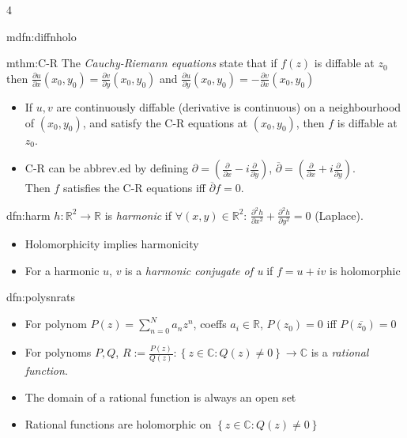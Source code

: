 \documentclass[landscape, 8pt]{extarticle}
\begin{document}
\begin{multicols*}{4}
\begin{mdfn}{mdfn:diffnholo}{ }
		\end{mdfn}
		
		
		\begin{mthm}{mthm:C-R}{ }
			The \textit{Cauchy-Riemann equations} state that if $f(z)$ is diffable at $z_0$ then $\frac{\partial u}{\partial x}(x_0, y_0) = \frac{\partial  v}{\partial  y}(x_0, y_0)$ and $\frac{\partial  u}{\partial  y}(x_0, y_0) = - \frac{\partial  v}{\partial  x}(x_0, y_0)$
			
			\begin{itemize}
				\item If $u, v$ are continuously diffable (derivative is continuous) on a neighbourhood of $(x_0, y_0)$, and satisfy the C-R equations at $(x_0, y_0)$, then $f$ is diffable at $z_0$.
				\item C-R can be abbrev.ed by defining $\partial = \left(\frac{\partial }{\partial x} - i \frac{\partial }{\partial  y}\right)$, $\overline{\partial } = \left(\frac{\partial }{\partial x} + i \frac{\partial }{\partial  y} \right)$. \\
				Then $f$ satisfies the C-R equations iff $\overline{\partial }f = 0$.
			
			\end{itemize}
			
		\end{mthm}
		
		
		\begin{dfn}{dfn:harm}{ }
			$h: \mathbb{R}^2 \to \mathbb{R}$ is \textit{harmonic} if $\forall (x, y) \in \mathbb{R}^2$: $\frac{\partial^2 h}{\partial x^2} + \frac{\partial^2 h}{\partial y^2} = 0$ (Laplace).
			\begin{itemize}
				\item Holomorphicity implies harmonicity
				\item For a harmonic $u$, $v$ is a \textit{harmonic conjugate of u} if $f = u + iv$ is holomorphic 
			\end{itemize}
			
		\end{dfn}
		
		
		\begin{dfn}{dfn:polysnrats}{ }
			\begin{itemize}
				\item For polynom $P(z) = \sum_{n=0}^{N} a_n z^n$, coeffs $a_i \in \mathbb{R}$, $P(z_0) = 0$ iff $P(\overline{z_0}) = 0$
				\item For polynoms $P, Q$, $R:= \frac{P(z)}{Q(z)}: \left\{z \in \mathbb{C}: Q(z) \ne 0\right\} \to \mathbb{C}$ is a \textit{rational function}.
				\item The domain of a rational function is always an open set
				\item Rational functions are holomorphic on $\left\{z \in \mathbb{C}: Q(z) \ne 0\right\}$
			\end{itemize}
			

\end{dfn}
\end{multicols*}
\end{document}
